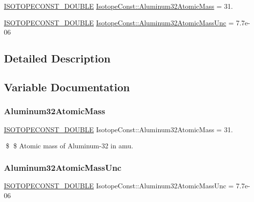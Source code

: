 \begin{DoxyCompactItemize}
\item 
\mbox{\hyperlink{group___isotope_const-_macros_ga8f45a7272ce02c0b4c65c44636ed719a}{I\+S\+O\+T\+O\+P\+E\+C\+O\+N\+S\+T\+\_\+\+D\+O\+U\+B\+LE}} \mbox{\hyperlink{group___isotope_const-_aluminum-_al32_gab5e19a02409c5f2f623be1fc96efcf41}{Isotope\+Const\+::\+Aluminum32\+Atomic\+Mass}} = 31.
\item 
\mbox{\hyperlink{group___isotope_const-_macros_ga8f45a7272ce02c0b4c65c44636ed719a}{I\+S\+O\+T\+O\+P\+E\+C\+O\+N\+S\+T\+\_\+\+D\+O\+U\+B\+LE}} \mbox{\hyperlink{group___isotope_const-_aluminum-_al32_gac61eb692025042fc3423c44e3f793101}{Isotope\+Const\+::\+Aluminum32\+Atomic\+Mass\+Unc}} = 7.\+7e-\/06
\end{DoxyCompactItemize}


\subsection{Detailed Description}


\subsection{Variable Documentation}
\mbox{\label{group___isotope_const-_aluminum-_al32_gab5e19a02409c5f2f623be1fc96efcf41}} 
\subsubsection{\texorpdfstring{Aluminum32\+Atomic\+Mass}{Aluminum32AtomicMass}}
{\footnotesize\ttfamily \mbox{\hyperlink{group___isotope_const-_macros_ga8f45a7272ce02c0b4c65c44636ed719a}{I\+S\+O\+T\+O\+P\+E\+C\+O\+N\+S\+T\+\_\+\+D\+O\+U\+B\+LE}} Isotope\+Const\+::\+Aluminum32\+Atomic\+Mass = 31.}

\$ \$ Atomic mass of Aluminum-\/32 in amu. \mbox{\label{group___isotope_const-_aluminum-_al32_gac61eb692025042fc3423c44e3f793101}} 
\subsubsection{\texorpdfstring{Aluminum32\+Atomic\+Mass\+Unc}{Aluminum32AtomicMassUnc}}
{\footnotesize\ttfamily \mbox{\hyperlink{group___isotope_const-_macros_ga8f45a7272ce02c0b4c65c44636ed719a}{I\+S\+O\+T\+O\+P\+E\+C\+O\+N\+S\+T\+\_\+\+D\+O\+U\+B\+LE}} Isotope\+Const\+::\+Aluminum32\+Atomic\+Mass\+Unc = 7.\+7e-\/06}


